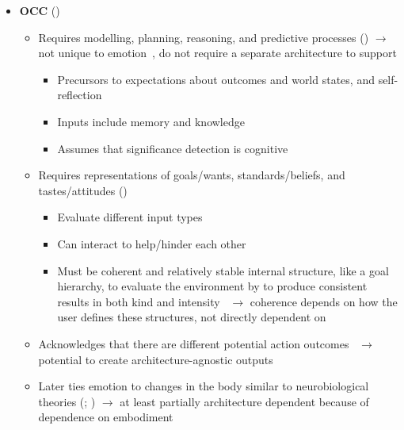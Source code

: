 \begin{itemize}
    \item \textbf{OCC} (\strong)
    \begin{itemize}
        \item Requires modelling, planning, reasoning, and predictive processes
        () $\rightarrow$ not unique to
        emotion~\citep[p.~36]{clore2000cognition}, do not require a separate
        architecture to support \progname{}
        \begin{itemize}
            \item Precursors to expectations about outcomes and world states,
            and self-reflection~\citep[p.~195]{ortony2005affect}

            \item Inputs include memory and
            knowledge~\citep[p.~101]{smith2000consequences}

            \item Assumes that significance detection is
            cognitive~\citep[p.~42]{clore2000cognition}
        \end{itemize}

        \item Requires representations of goals/wants, standards/beliefs, and
        tastes/attitudes ()
        \begin{itemize}
            \item Evaluate different input types~\citep[p.~48]{occ}

            \item Can interact to help/hinder each other~\citep[p.~47]{occ}

            \item Must be coherent and relatively stable internal structure,
            like a goal hierarchy, to evaluate the environment by to produce
            consistent results in both kind and
            intensity~\citep[p.~194--195]{ortony2002making} $\rightarrow$
            coherence depends on how the user defines these structures, not
            directly dependent on \progname{}
        \end{itemize}

        \item Acknowledges that there are different potential action
        outcomes~\citep[p.41]{clore2000cognition} $\rightarrow$ potential to
        create architecture-agnostic outputs

        \item Later ties emotion to changes in the body similar to
        neurobiological theories (; ) $\rightarrow$ at
        least partially architecture dependent because of dependence on
        embodiment
    \end{itemize}


\end{itemize}
